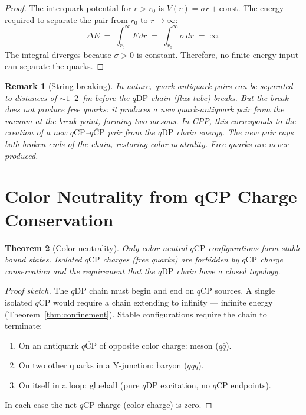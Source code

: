 \documentclass[12pt]{article}
\newtheorem{theorem}{Theorem}[section]
\newtheorem{remark}[theorem]{Remark}
\newcommand{\qCP}{q\mathrm{CP}}
\newcommand{\qDP}{q\mathrm{DP}}
\begin{document}
\begin{proof}
The interquark potential for $r > r_0$ is $V(r) = \sigma r + \text{const}$.
The energy required to separate the pair from $r_0$ to $r \to \infty$:
\begin{equation}
\Delta E \;=\; \int_{r_0}^{\infty} F\,dr
\;=\; \int_{r_0}^{\infty} \sigma\,dr
\;=\; \infty.
\label{eq:confinement_proof}
\end{equation}
The integral diverges because $\sigma > 0$ is constant. Therefore,
no finite energy input can separate the quarks.
\end{proof}

\begin{remark}[String breaking]
In nature, quark-antiquark pairs can be separated to distances of
$\sim 1$--$2$~fm before the $\qDP$ chain (flux tube) breaks.
But the break does not produce free quarks: it produces a new
quark-antiquark pair from the vacuum at the break point, forming
two mesons. In CPP, this corresponds to the creation of a new
$\qCP$--$\overline{\qCP}$ pair from the $\qDP$ chain energy.
The new pair caps both broken ends of the chain, restoring color
neutrality. Free quarks are never produced.
\end{remark}

\section{Color Neutrality from qCP Charge Conservation}
\label{sec:color}

\begin{theorem}[Color neutrality]
\label{thm:color_neutral}
Only color-neutral $\qCP$ configurations form stable bound states.
Isolated $\qCP$ charges (free quarks) are forbidden by $\qCP$
charge conservation and the requirement that the $\qDP$ chain have
a closed topology.
\end{theorem}

\begin{proof}[Proof sketch]
The $\qDP$ chain must begin and end on $\qCP$ sources. A single
isolated $\qCP$ would require a chain extending to infinity — infinite
energy (Theorem~\ref{thm:confinement}). Stable configurations require
the chain to terminate:
\begin{enumerate}[noitemsep]
\item On an antiquark $\overline{\qCP}$ of opposite color charge:
  meson ($q\bar q$).
\item On two other quarks in a Y-junction: baryon ($qqq$).
\item On itself in a loop: glueball (pure $\qDP$ excitation, no
  $\qCP$ endpoints).
\end{enumerate}
In each case the net $\qCP$ charge (color charge) is zero.
\end{proof}
\end{document}
